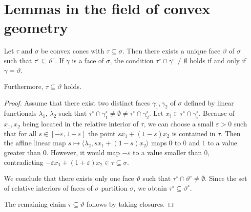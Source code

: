 \chapter{Lemmas in the field of convex geometry}

\begin{lemmaApp}
	\label{lemma:cones_in_cones}
	Let $\tau$ and $\sigma$ be convex cones with $\tau\subseteq \sigma$. Then there exists a unique face $\vartheta$ of $\sigma$ such that $\tau^\circ \subseteq \vartheta^\circ$. If $\gamma$ is a face of $\sigma$, the condition $\tau^\circ \cap \gamma^\circ \neq \emptyset$ holds if and only if $\gamma=\vartheta$.
	
	Furthermore, $\tau \subseteq \vartheta$ holds.
\end{lemmaApp}
\begin{proof}
	Assume that there exist two distinct faces $\gamma_1,\gamma_2$ of $\sigma$ defined by linear functionals $\lambda_1$, $\lambda_2$ such that $\tau^\circ \cap \gamma_1^\circ \neq \emptyset \neq \tau^\circ \cap \gamma_2^\circ$. Let $x_i\in\tau^\circ \cap \gamma_i^\circ$. Because of $x_1, x_2$ being located in the relative interior of $\tau$, we can choose a small $\varepsilon > 0$ such that for all $s\in[-\varepsilon,1+\varepsilon]$ the point $sx_1 + (1-s)x_2$ is contained in $\tau$. Then the affine linear map $s\mapsto \langle \lambda_2, sx_1 + (1-s)x_2\rangle$ maps $0$ to $0$ and $1$ to a value greater than $0$. However, it would map $-\varepsilon$ to a value smaller than $0$, contradicting $-\varepsilon x_1 + (1 + \varepsilon)x_2\in\tau\subseteq\sigma$.
	
	We conclude that there exists only one face $\vartheta$ such that $\tau^\circ \cap \vartheta^\circ \neq \emptyset$. Since the set of relative interiors of faces of $\sigma$ partition $\sigma$, we obtain $\tau^\circ \subseteq \vartheta^\circ$.
	
	The remaining claim $\tau \subseteq \vartheta$ follows by taking closures.
\end{proof}


